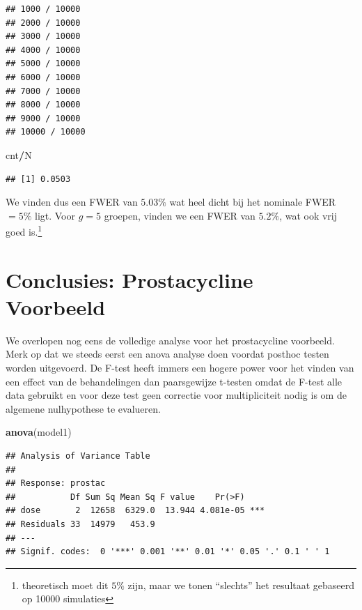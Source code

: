 \documentclass[
  12pt,dutch]{book}
\newenvironment{Shaded}{\begin{snugshade}}{\end{snugshade}}
\newcommand{\FunctionTok}[1]{\textcolor[rgb]{0.13,0.29,0.53}{\textbf{#1}}}
\newcommand{\NormalTok}[1]{#1}
\newcommand{\SpecialCharTok}[1]{\textcolor[rgb]{0.81,0.36,0.00}{\textbf{#1}}}
\theoremstyle{definition}
\theoremstyle{definition}
\theoremstyle{definition}
\theoremstyle{definition}
\theoremstyle{remark}
\begin{document}
\begin{verbatim}
## 1000 / 10000 
## 2000 / 10000 
## 3000 / 10000 
## 4000 / 10000 
## 5000 / 10000 
## 6000 / 10000 
## 7000 / 10000 
## 8000 / 10000 
## 9000 / 10000 
## 10000 / 10000
\end{verbatim}

\begin{Shaded}
\begin{Highlighting}[]
\NormalTok{cnt}\SpecialCharTok{/}\NormalTok{N}
\end{Highlighting}
\end{Shaded}

\begin{verbatim}
## [1] 0.0503
\end{verbatim}

We vinden dus een FWER van \(5.03\%\) wat heel dicht bij het nominale FWER\(=5\%\) ligt.
Voor \(g=5\) groepen, vinden we een FWER van \(5.2\%\), wat ook vrij goed is.\footnote{theoretisch moet dit \(5\%\) zijn, maar we tonen ``slechts'' het resultaat gebaseerd op 10000 simulaties}

\section{Conclusies: Prostacycline Voorbeeld}\label{conclusies-prostacycline-voorbeeld}

We overlopen nog eens de volledige analyse voor het prostacycline voorbeeld.
Merk op dat we steeds eerst een anova analyse doen voordat posthoc testen worden uitgevoerd.
De F-test heeft immers een hogere power voor het vinden van een effect van de behandelingen dan paarsgewijze t-testen omdat de F-test alle data gebruikt en voor deze test geen correctie voor multipliciteit nodig is om de algemene nulhypothese te evalueren.

\begin{Shaded}
\begin{Highlighting}[]
\FunctionTok{anova}\NormalTok{(model1)}
\end{Highlighting}
\end{Shaded}

\begin{verbatim}
## Analysis of Variance Table
## 
## Response: prostac
##           Df Sum Sq Mean Sq F value    Pr(>F)    
## dose       2  12658  6329.0  13.944 4.081e-05 ***
## Residuals 33  14979   453.9                      
## ---
## Signif. codes:  0 '***' 0.001 '**' 0.01 '*' 0.05 '.' 0.1 ' ' 1
\end{verbatim}
\end{document}
